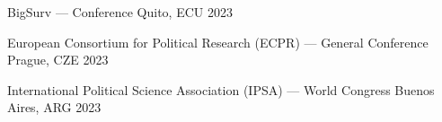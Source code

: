 





\hspace{2.25mm}{\footnotesize $^\star$ Selection of only the last five years}

\vspace{1mm}

\begin{cvhonors}
\cvconf
{BigSurv --- Conference} 
{Quito, ECU}
{2023}
\end{cvhonors}

\begin{cvhonors}
\cvconf
{European Consortium for Political Research (ECPR) --- General Conference} 
{Prague, CZE}
{2023}
\end{cvhonors}

\begin{cvhonors}
\cvconf
{International Political Science Association (IPSA) --- World Congress} 
{Buenos Aires, ARG}
{2023}
\end{cvhonors}



